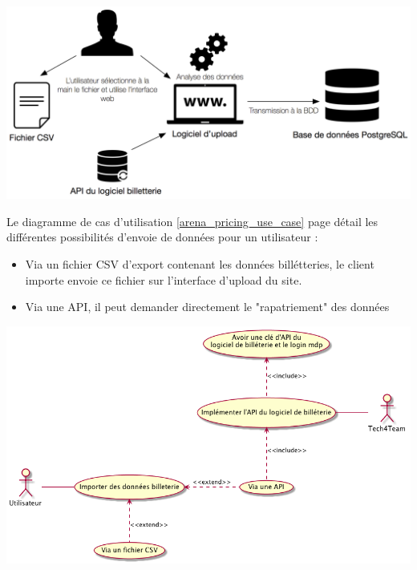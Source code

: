 \begin{center}
\includegraphics[scale=0.57]{images/datafit.png}
\label{interface_upload}
\end{center}


Le diagramme de cas d'utilisation \ref{arena_pricing_use_case} page \pageref{arena_pricing_use_case} détail les différentes possibilités d'envoie de données pour un utilisateur :
\begin{itemize}
	\item[\textbullet] Via un fichier CSV d'export contenant les données billétteries, le client importe envoie ce fichier sur l'interface d'upload du site.
	\item[\textbullet] Via une API, il peut demander directement le "rapatriement" des données 
\end{itemize}


\begin{center}
\includegraphics[scale=0.57]{images/arenapricing-use-case.png}
\label{arena_pricing_use_case}
\end{center}


